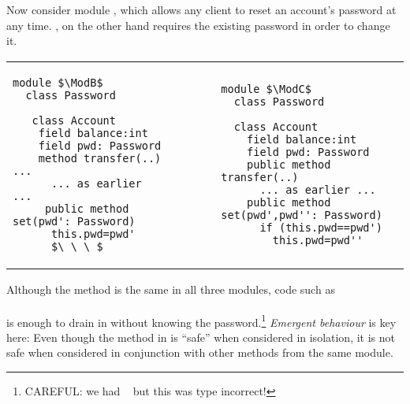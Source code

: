  
Now consider  module \ModB, which allows any client to reset an account's password at any time.  \ModC, on the other hand  requires the existing password in order to change it.
  
  

\begin{tabular}{lll}
\begin{minipage}[b]{0.42\textwidth}
\begin{lstlisting}[mathescape=true, language=Chainmail, frame=lines]
module $\ModB$
  class Password
  
   class Account
    field balance:int 
    field pwd: Password 
    method transfer(..) ...
      ... as earlier ...
     public method set(pwd': Password)
      this.pwd=pwd'
      $\ \ \ $
\end{lstlisting}
\end{minipage}
&\ \ \  \ \   &%
\begin{minipage}[b]{0.45\textwidth}
\begin{lstlisting}[mathescape=true, language=chainmail, frame=lines]
module $\ModC$
  class Password

  class Account
    field balance:int 
    field pwd: Password 
    public method transfer(..) 
      ... as earlier ...
    public method set(pwd',pwd'': Password)
      if (this.pwd==pwd') 
        this.pwd=pwd''
\end{lstlisting}
\end{minipage} 
\end{tabular}

\noindent
Although the  method is the same in
all three modules,   %
code  {such as}
\\ 
$\ \strut \hspace{.2in} $  
\\ 
is enough to drain   in \ModB without knowing the password.\footnote{CAREFUL: we had 
$\ \strut \hspace{.01in} $  but this was type incorrect!}
%
\emph{Emergent behaviour} is key here: 
Even though the method  in  \ModB is ``safe'' when considered in isolation, it is not safe when considered in conjunction with other methods from the same module. 
   
